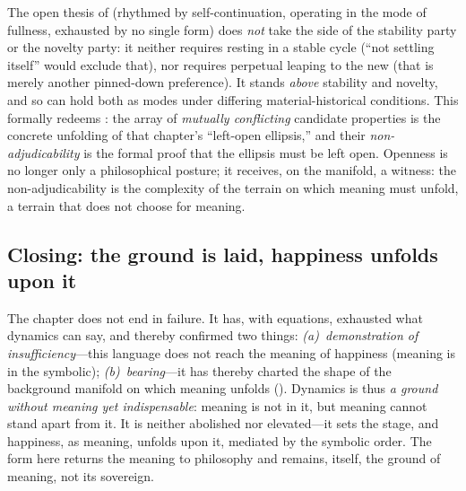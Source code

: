 The open thesis of  (rhythmed by self-continuation, operating in the mode of fullness, exhausted by no single form) does \emph{not} take the side of the stability party or the novelty party: it neither requires resting in a stable cycle (``not settling itself'' would exclude that), nor requires perpetual leaping to the new (that is merely another pinned-down preference). It stands \emph{above} stability and novelty, and so can hold both as modes under differing material-historical conditions. This formally redeems : the array of \emph{mutually conflicting} candidate properties is the concrete unfolding of that chapter's ``left-open ellipsis,'' and their \emph{non-adjudicability} is the formal proof that the ellipsis must be left open. Openness is no longer only a philosophical posture; it receives, on the manifold, a witness: the non-adjudicability is the complexity of the terrain on which meaning must unfold, a terrain that does not choose for meaning.

\subsection{Closing: the ground is laid, happiness unfolds upon it}
\label{p19:sub:dyn-close}

The chapter does not end in failure. It has, with equations, exhausted what dynamics can say, and thereby confirmed two things: \emph{(a)~demonstration of insufficiency}---this language does not reach the meaning of happiness (meaning is in the symbolic); \emph{(b)~bearing}---it has thereby charted the shape of the background manifold on which meaning unfolds (). Dynamics is thus \emph{a ground without meaning yet indispensable}: meaning is not in it, but meaning cannot stand apart from it. It is neither abolished nor elevated---it sets the stage, and happiness, as meaning, unfolds upon it, mediated by the symbolic order. The form here returns the meaning to philosophy and remains, itself, the ground of meaning, not its sovereign.

